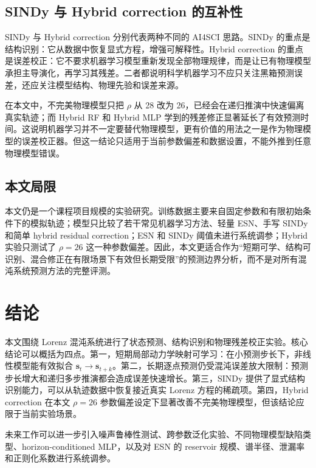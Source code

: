 \documentclass[UTF8,a4paper,12pt]{ctexart}
\begin{document}
\subsection{SINDy 与 Hybrid correction 的互补性}

SINDy 与 Hybrid correction 分别代表两种不同的 AI4SCI 思路。SINDy 的重点是结构识别：它从数据中恢复显式方程，增强可解释性。Hybrid correction 的重点是误差校正：它不要求机器学习模型重新发现全部物理规律，而是让已有物理模型承担主导演化，再学习其残差。二者都说明科学机器学习不应只关注黑箱预测误差，还应关注模型结构、物理先验和误差来源。

在本文中，不完美物理模型只把 $\rho$ 从 28 改为 26，已经会在递归推演中快速偏离真实轨迹；而 Hybrid RF 和 Hybrid MLP 学到的残差修正显著延长了有效预测时间。这说明机器学习并不一定要替代物理模型，更有价值的用法之一是作为物理模型的误差校正器。但这一结论只适用于当前参数偏差和数据设置，不能外推到任意物理模型错误。

\subsection{本文局限}

本文仍是一个课程项目规模的实验研究。训练数据主要来自固定参数和有限初始条件下的模拟轨迹；模型只比较了若干常见机器学习方法、轻量 ESN、手写 SINDy 和简单 hybrid residual correction；ESN 和 SINDy 阈值未进行系统调参；Hybrid 实验只测试了 $\rho=26$ 这一种参数偏差。因此，本文更适合作为“短期可学、结构可识别、混合修正在有限场景下有效但长期受限”的预测边界分析，而不是对所有混沌系统预测方法的完整评测。

\section{结论}

本文围绕 Lorenz 混沌系统进行了状态预测、结构识别和物理残差校正实验。核心结论可以概括为四点。第一，短期局部动力学映射可学习：在小预测步长下，非线性模型能有效拟合 $\mathbf{s}_t\to\mathbf{s}_{t+k}$。第二，长期逐点预测仍受混沌误差放大限制：预测步长增大和递归多步推演都会造成误差快速增长。第三，SINDy 提供了显式结构识别能力，可以从轨迹数据中恢复接近真实 Lorenz 方程的稀疏项。第四，Hybrid correction 在本文 $\rho=26$ 参数偏差设定下显著改善不完美物理模型，但该结论应限于当前实验场景。

未来工作可以进一步引入噪声鲁棒性测试、跨参数泛化实验、不同物理模型缺陷类型、horizon-conditioned MLP，以及对 ESN 的 reservoir 规模、谱半径、泄漏率和正则化系数进行系统调参。
\end{document}
